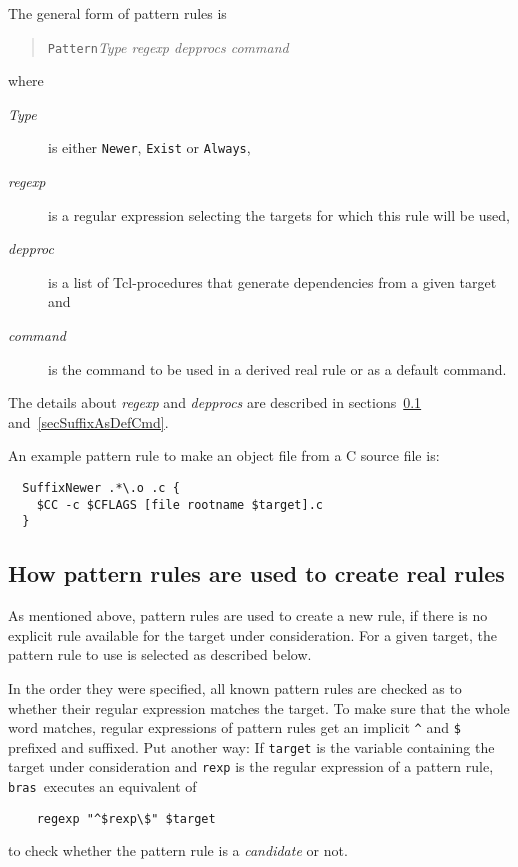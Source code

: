 \documentclass[12pt]{article}
\newcommand{\bras}{\texttt{bras}}
\begin{document}
The general form of pattern rules is
\begin{quote}
\texttt{Pattern}\textit{Type regexp depprocs command}
\end{quote}

where 

\begin{description}
\item[\textit{Type}] is either \texttt{Newer}, \texttt{Exist} or
\texttt{Always},
\item[\textit{regexp}] is a regular expression selecting the targets
for which this rule will be used,
\item[\textit{depproc}] is a list of Tcl-procedures that generate
dependencies from a given target and
\item[\textit{command}] is the command to be used in a derived real
rule or as a default command.
\end{description}

The details about \textit{regexp} and \textit{depprocs} are described
in sections~\ref{secSuffixToReal} and~\ref{secSuffixAsDefCmd}.

An example pattern rule to make an object file from a C source file is:
\begin{verbatim}
  SuffixNewer .*\.o .c {
    $CC -c $CFLAGS [file rootname $target].c
  }
\end{verbatim}

\subsection{How pattern rules are used to create real rules}
\label{secSuffixToReal}

As mentioned above, pattern rules are used to create a new rule, if
there is no explicit rule available for the target under
consideration. 
For a given target, the pattern rule to use is selected as described
below.

In the order they were specified, all known pattern rules are checked
as to whether their regular expression matches the target. To make
sure that the whole word matches, regular expressions of pattern rules
get an implicit \verb+^+ and \texttt{\$} prefixed and suffixed. Put
another way: If \texttt{target} is the variable containing the target
under consideration and \texttt{rexp} is the regular expression of a
pattern rule, \bras\ executes an equivalent of
\begin{verbatim}
    regexp "^$rexp\$" $target
\end{verbatim}
to check whether the pattern rule is a \textit{candidate} or not.
\end{document}
